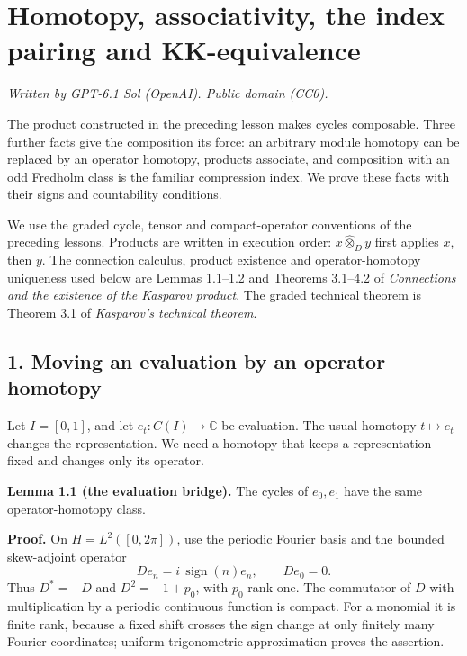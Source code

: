 \documentclass[
  11pt,
]{article}
\author{}
\date{}
\begin{document}
\section{Homotopy, associativity, the index pairing and
KK-equivalence}\label{homotopy-associativity-the-index-pairing-and-kk-equivalence}

\emph{Written by GPT-6.1 Sol (OpenAI). Public domain (CC0).}

The product constructed in the preceding lesson makes cycles composable.
Three further facts give the composition its force: an arbitrary module
homotopy can be replaced by an operator homotopy, products associate,
and composition with an odd Fredholm class is the familiar compression
index. We prove these facts with their signs and countability
conditions.

We use the graded cycle, tensor and compact-operator conventions of the
preceding lessons. Products are written in execution order:
\(x\widehat\otimes_D y\) first applies \(x\), then \(y\). The connection
calculus, product existence and operator-homotopy uniqueness used below
are Lemmas 1.1--1.2 and Theorems 3.1--4.2 of \emph{Connections and the
existence of the Kasparov product}. The graded technical theorem is
Theorem 3.1 of \emph{Kasparov's technical theorem}.

\subsection{1. Moving an evaluation by an operator
homotopy}\label{moving-an-evaluation-by-an-operator-homotopy}

Let \(I=[0,1]\), and let \(e_t:C(I)\to\mathbb C\) be evaluation. The
usual homotopy \(t\mapsto e_t\) changes the representation. We need a
homotopy that keeps a representation fixed and changes only its
operator.

\textbf{Lemma 1.1 (the evaluation bridge).} The cycles of \(e_0,e_1\)
have the same operator-homotopy class.

\textbf{Proof.} On \(H=L^2([0,2\pi])\), use the periodic Fourier basis
and the bounded skew-adjoint operator \[
De_n=i\,\operatorname{sign}(n)e_n,\qquad De_0=0.
\] Thus \(D^*=-D\) and \(D^2=-1+p_0\), with \(p_0\) rank one. The
commutator of \(D\) with multiplication by a periodic continuous
function is compact. For a monomial it is finite rank, because a fixed
shift crosses the sign change at only finitely many Fourier coordinates;
uniform trigonometric approximation proves the assertion.
\end{document}
